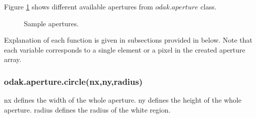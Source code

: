 \documentclass[journal,9pt]{IEEEtran}
\begin{document}
Figure \ref{fig:aperture} shows different available apertures from $odak.aperture$ class.

\begin{figure}[H]
  \centering
   \hspace{2mm}   
   \hspace{2mm}       
   \hspace{2mm}    
   \hspace{2mm}   
  \caption{Sample apertures.}
  \label{fig:aperture}  
\end{figure}
\IEEEpubidadjcol

Explanation of each function is given in subsections provided in below. Note that each variable corresponds to a single element or a pixel in the created aperture array.\\

\subsubsection{odak.aperture.circle(nx,ny,radius)}
nx defines the width of the whole aperture. ny defines the height of the whole aperture. radius defines the radius of the white region.\\
\end{document}
